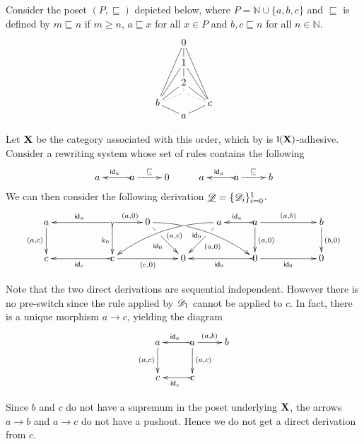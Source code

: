 \begin{example}\label{ex:diff1}
	Consider the poset $(P, \sqsubseteq)$ depicted below, where
	$P = \mathbb{N} \cup \{a,b,c\}$ and $\sqsubseteq$ is defined by
	$m \sqsubseteq n$ if $m \geq n$, $a \sqsubseteq x$ for all $x \in P$
	and $b, c \sqsubseteq n$ for all $n \in \mathbb{N}$.
	\[\xymatrix@C=16pt@R=1pt{
		& 0 \ar@{-}[dd] \ar@{-}[ddddddl] \ar@{-}[ddddddr] &  \\
		&  & \\
		& 1 \ar@{-}[dd] \ar@{-}[ddddl]  \ar@{-}[ddddr]   &  \\
		&  & \\
		& 2 \ar@{.}[d] \ar@{-}[ddl]   \ar@{-}[ddr]     &  \\
		&  \ar@{.}[dl]   \ar@{.}[dr] & \\
		b \ar@{-}[dr] & & c \ar@{-}[dl]\\
		& a} \]
		
	Let $\textbf {\textup{X}}$ be the  
	category associated with this order, which by  is
	$\mathsf{I(\textbf {\textup{X}})}$-adhesive. Consider a rewriting
	system whose set of rules contains the following 
	\[\xymatrix{a & a \ar[r]^{\sqsubseteq} \ar@{>->}[l]_{\id{a}} & 0 & a & a
		\ar[r]^{\sqsubseteq} \ar@{>->}[l]_{\id{a}} & b }\]
	We can then consider the  following derivation
	$\underline{\mathscr{D}}=\{\mathscr{D}_i\}_{i=0}^1$.
	 \[
   \xymatrix@C=25pt{a \ar[d]_{(a,c)}&& \ar@{>->}[d]_{k_0}\ar[ll]_{\id{a}}
		    \ar[r]^{(a,0)} & 0 \ar@/^.35cm/[drrr]|(.315)\hole_(.45){\id{0}}
		    \ar[dr]|(.3)\hole_{\id{0}} && a \ar@/_.35cm/[dlll]^(.45){\hspace{5pt}(a,c)}
		     \ar[dl]|(.3)\hole^{(a,0)}& a \ar[d]^{(a,0)}\ar@{>->}[l]_{\id{a}}
		     \ar[rr]^{(a,b)} && b \ar[d]^{(b,0)}\\c &&
		     \ar@{>->}[ll]^{\id{c}} c \ar[rr]_{(c,0)}&& 0 &&
		     \ar@{>->}[ll]^{\id{0}} 0 \ar[rr]_{\id{0}}&& 0}\]

	Note that the two direct derivations are sequential
	independent. However there is no pre-switch since the rule applied by
	$\mathscr{D}_1$ cannot be applied to $c$. In fact, there is a unique morphism
	$a\to c$, yielding the diagram
	\[	\xymatrix{a \ar[d]_{(a,c)}& a
		\ar[d]^{(a,c)}\ar@{>->}[l]_{\id{a}} \ar[r]^{(a,b)}& b \\c & c
		\ar@{>->}[l]^{\id{c}}
	}\]
	
	Since $b$ and $c$ do not have a supremum in the poset underlying $\textbf {\textup{X}}$, the arrows
	$a\to b$ and $a\to c$ do not have a pushout. Hence we do not get a direct derivation from $c$.
\end{example}

